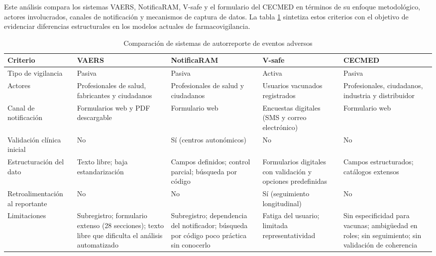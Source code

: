 Este análisis compara los sistemas VAERS, NotificaRAM, V-safe y el formulario del CECMED en términos de su enfoque metodológico, actores involucrados, canales de notificación y mecanismos de captura de datos. La tabla \ref{tab:sistemas_comparacion} sintetiza estos criterios con el objetivo de evidenciar diferencias estructurales en los modelos actuales de farmacovigilancia.

\begin{table}[htbp]
\centering
\renewcommand{\arraystretch}{1.3}
\begin{tabular}{|p{3.5cm}|p{2.7cm}|p{2.7cm}|p{2.7cm}|p{2.7cm}|}
\hline
\textbf{Criterio} & \textbf{VAERS} & \textbf{NotificaRAM} & \textbf{V-safe} & \textbf{CECMED}\\[6pt]
\hline
		Tipo de vigilancia &
		Pasiva  &
		Pasiva  &
		Activa  &
		Pasiva \\[6pt]
		\hline

		Actores &
		Profesionales de salud, fabricantes y ciudadanos &
		Profesionales de salud y ciudadanos &
		Usuarios vacunados registrados &
		Profesionales, ciudadanos, industria y distribuidor\\[6pt]
        \hline
		
		Canal de notificación &
		Formularios web y PDF descargable &
		Formulario web &
		Encuestas digitales (SMS y correo electrónico) &
		Formulario web\\[6pt]
        \hline
		
		Validación clínica inicial &
No &
Sí (centros autonómicos) &
No &
No \\[6pt]
\hline
		
		Estructuración del dato &
		Texto libre; baja estandarización &
		Campos definidos; control parcial; búsqueda por código &
		Formularios digitales con validación y opciones predefinidas &
		Campos estructurados; catálogos extensos
		\\[6pt]
        \hline


		Retroalimentación al reportante &
No &
No &
Sí (seguimiento longitudinal) &
No \\[6pt]
\hline
		
		
	Limitaciones &
Subregistro; formulario extenso (28 secciones); texto libre que dificulta el análisis automatizado &
Subregistro; dependencia del notificador; búsqueda por código poco práctica sin conocerlo &
Fatiga del usuario; limitada representatividad &
Sin especificidad para vacunas; ambigüedad en roles; sin seguimiento; sin validación de coherencia \\

\hline
\end{tabular}
\caption{Comparación de sistemas de autorreporte de eventos adversos}
\label{tab:sistemas_comparacion}
\end{table}



